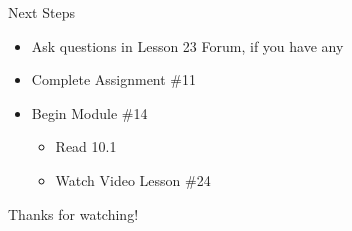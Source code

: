 \documentclass[t]{beamer}
\begin{document}
	\begin{frame}{Next Steps}
		\begin{itemize}
			\item Ask questions in Lesson 23 Forum, if you have any
			\item Complete Assignment \#11
			\item Begin Module \#14
			\begin{itemize}
				\item Read 10.1
				\item Watch Video Lesson \#24
			\end{itemize}
		\end{itemize}
	
		\vfill
		
		Thanks for watching!
	\end{frame}
\end{document}
